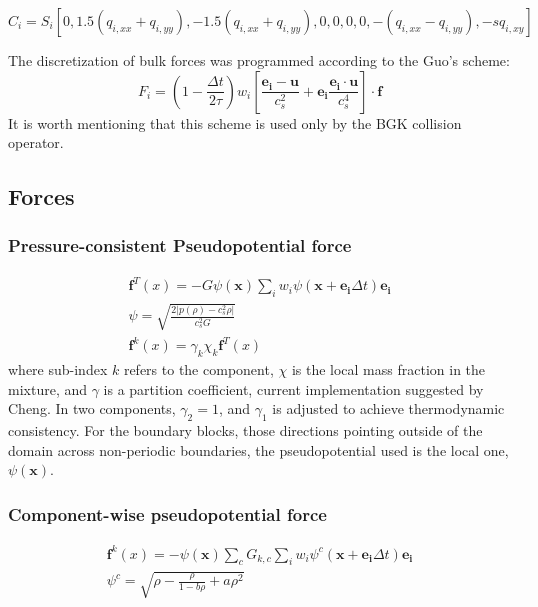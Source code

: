 \documentclass{article}
\begin{document}
	\begin{equation}
		C_i = S_i [0, 1.5 (q_{i,xx}+q_{i,yy}), -1.5 (q_{i,xx}+q_{i,yy}), 0, 0, 0, 0, - (q_{i,xx} - q_{i,yy}), -s q_{i,xy}]
	\end{equation}
	
	The discretization of bulk forces was programmed according to the Guo's scheme:
	\begin{equation}
		F_i = (1 - \frac{\Delta t}{2\tau}) w_i [\frac{\mathbf{e_i}- \mathbf{u}}{c^2_s} + \mathbf{e_i} \frac{\mathbf{e_i}\cdot \mathbf{u}}{c^4_s}]\cdot \mathbf{f}
	\end{equation}
	It is worth mentioning that this scheme is used only by the BGK collision operator.
	
	\subsection{Forces}
		
		\subsubsection{Pressure-consistent Pseudopotential force}
		
		\begin{equation}
		\begin{split}
			\mathbf{f}^{T} (x) = -G \psi (\mathbf{x})\sum_i w_i \psi(\mathbf{x}+\mathbf{e_i}\Delta t) \mathbf{e_i}\\
			\psi = \sqrt{\frac{2 \vert p(\rho) - c^2_s \rho \vert }{c^2_s G}}\\
			\mathbf{f}^{k} (x) = \gamma_{k} \chi_{k} \mathbf{f}^{T} (x)
			\end{split}
		\end{equation}
		where sub-index $k$ refers to the component, $\chi$ is the local mass fraction in the mixture, and $\gamma$ is a partition coefficient, current implementation suggested by Cheng. In two components, $\gamma_2 = 1$, and $\gamma_1$ is adjusted to achieve thermodynamic consistency. For the boundary blocks, those directions pointing outside of the domain across non-periodic boundaries, the pseudopotential used is the local one, $\psi (\mathbf{x})$.
		
		\subsubsection{Component-wise pseudopotential force}
			\begin{equation}
		\begin{split}
			\mathbf{f}^{k} (x) = -\psi (\mathbf{x})\sum_c G_{k,c} \sum_i w_i \psi^c(\mathbf{x}+\mathbf{e_i}\Delta t) \mathbf{e_i}\\
			\psi^c = \sqrt{\rho - \frac{\rho}{1-b\rho} + a \rho^2}
		\end{split}
		\end{equation}
		
\end{document}
